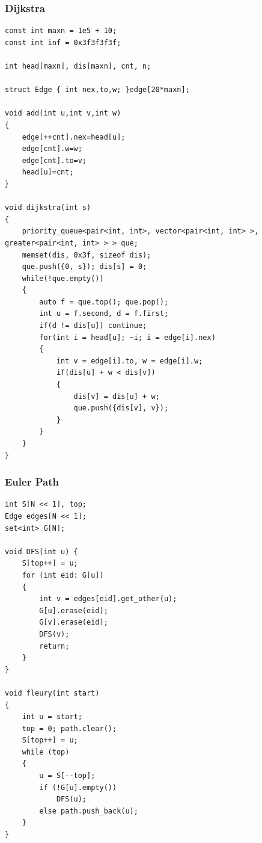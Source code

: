 \documentclass[twoside]{article}
\begin{document}
\subsubsection{Dijkstra}
\begin{lstlisting}
const int maxn = 1e5 + 10;
const int inf = 0x3f3f3f3f;

int head[maxn], dis[maxn], cnt, n;

struct Edge { int nex,to,w; }edge[20*maxn];

void add(int u,int v,int w)
{
    edge[++cnt].nex=head[u];
    edge[cnt].w=w;
    edge[cnt].to=v;
    head[u]=cnt;
}

void dijkstra(int s)
{
    priority_queue<pair<int, int>, vector<pair<int, int> >, greater<pair<int, int> > > que;
    memset(dis, 0x3f, sizeof dis);
    que.push({0, s}); dis[s] = 0;
    while(!que.empty())
    {
        auto f = que.top(); que.pop();
        int u = f.second, d = f.first;
        if(d != dis[u]) continue;
        for(int i = head[u]; ~i; i = edge[i].nex)
        {
            int v = edge[i].to, w = edge[i].w;
            if(dis[u] + w < dis[v])
            {
                dis[v] = dis[u] + w;
                que.push({dis[v], v});
            }
        }
    }
}\end{lstlisting}
\subsubsection{Euler Path}
\begin{lstlisting}
int S[N << 1], top;
Edge edges[N << 1];
set<int> G[N];

void DFS(int u) {
    S[top++] = u;
    for (int eid: G[u]) 
    {
        int v = edges[eid].get_other(u);
        G[u].erase(eid);
        G[v].erase(eid);
        DFS(v);
        return;
    }
}

void fleury(int start) 
{
    int u = start;
    top = 0; path.clear();
    S[top++] = u;
    while (top) 
    {
        u = S[--top];
        if (!G[u].empty())
            DFS(u);
        else path.push_back(u);
    }
}\end{lstlisting}
\end{document}
